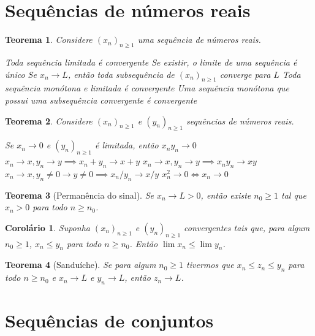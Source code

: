 \documentclass[12pt,a4paper,answers]{article}
\numberwithin{equation}{section} %
\theoremstyle{thm_estilo}
\newtheorem{theorem}{Teorema}[section]
\newtheorem{corollary}{Corolário}[section]
\theoremstyle{thm_note_est}
\begin{document}
\section{Sequências de números reais}

\begin{theorem}
	Considere $(x_n)_{n\geq1}$ uma sequência de números reais.
	\begin{outline}[enumerate]
		\1 Toda sequência limitada é convergente
		\1 Se existir, o limite de uma sequência é único
		\1 Se $x_n \to L$, então toda subsequência de $(x_n)_{n\geq1}$ converge para $L$
		\1 Toda sequência monótona e limitada é convergente
		\1 Uma sequência monótona que possui uma subsequência convergente é convergente
	\end{outline}
\end{theorem}

\begin{theorem}
	Considere $(x_n)_{n\geq1}$ e $(y_n)_{n\geq1}$ sequências de números reais.
	\begin{outline}[enumerate]
		\1 Se $x_n \to 0$ e $(y_n)_{n\geq1}$ é limitada, então $x_n y_n \to 0$
		\1 \( x_n \to x, y_n \to y \implies x_n+y_n \to x+y \)
		\1 \( x_n \to x, y_n \to y \implies x_n y_n \to xy \)
		\1 \( x_n \to x, y_n \neq 0 \to y\neq0 \implies x_n/y_n \to x/y \)
		\1 \(x_n^2 \to 0 \iff x_n \to0\)
	\end{outline}
\end{theorem}

\begin{theorem}[Permanência do sinal]
	Se $x_n\to L > 0$, então existe $n_0\geq1$ tal que $x_n>0$ para todo $n\geq n_0$.
\end{theorem}

\begin{corollary}
	Suponha $(x_n)_{n\geq1}$ e $(y_n)_{n\geq1}$ convergentes tais que, para algum $n_0 \geq 1$, $x_n \leq y_n$ para todo $n \geq n_0$. Então $\lim x_n \leq \lim y_n$.
\end{corollary}

\begin{theorem}[Sanduíche]
	Se para algum $n_0\geq1$ tivermos que $x_n\leq z_n \leq y_n$ para todo $n\geq n_0$ e $x_n \to L$ e $y_n\to L$, então $z_n \to L$.
\end{theorem}



\section{Sequências de conjuntos}
\end{document}
